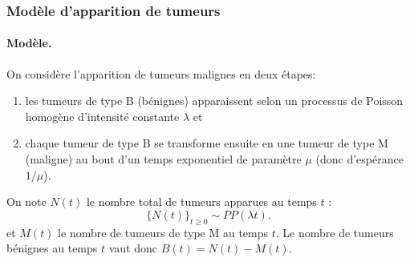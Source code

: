 \subsubsection{Modèle d'apparition de tumeurs}


\paragraph{Modèle.}
On considère l'apparition de tumeurs malignes en deux étapes:
\begin{enumerate}[($i$)]
  \item les tumeurs de type B (bénignes) apparaissent selon un processus de Poisson homogène d'intensité constante $\lambda$ et
  \item chaque tumeur de type B se transforme ensuite en une tumeur de type M (maligne) au bout d'un temps exponentiel de paramètre $\mu$ (donc d'espérance $1/\mu$).
\end{enumerate}

On note $N(t)$ le nombre total de tumeurs apparues au temps $t$ : 
$$
\{N(t)\}_{t \geq 0} \sim PP(\lambda t).
$$
et $M(t)$ le nombre de tumeurs de type M au temps $t$. Le nombre de tumeurs bénignes au temps $t$ vaut donc $B(t) = N(t) - M(t)$.

